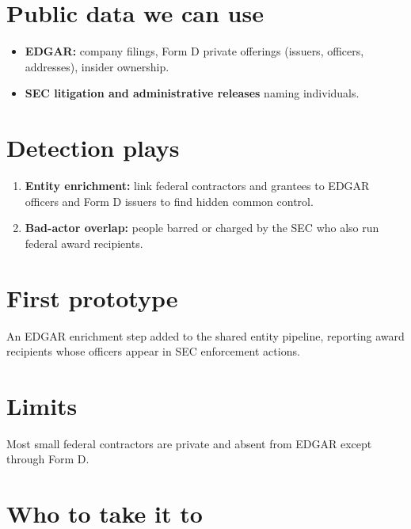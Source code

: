 \documentclass[letterpaper,11pt]{article}
\providecommand{\tightlist}{\setlength{\itemsep}{0pt}\setlength{\parskip}{0pt}}
\begin{document}
\hypertarget{public-data-we-can-use}{%
\section{Public data we can use}\label{public-data-we-can-use}}

\begin{itemize}
\tightlist
\item
  \textbf{EDGAR:} company filings, Form D private offerings (issuers,
  officers, addresses), insider ownership.
\item
  \textbf{SEC litigation and administrative releases} naming
  individuals.
\end{itemize}

\hypertarget{detection-plays}{%
\section{Detection plays}\label{detection-plays}}

\begin{enumerate}
\def\labelenumi{\arabic{enumi}.}
\tightlist
\item
  \textbf{Entity enrichment:} link federal contractors and grantees to
  EDGAR officers and Form D issuers to find hidden common control.
\item
  \textbf{Bad-actor overlap:} people barred or charged by the SEC who
  also run federal award recipients.
\end{enumerate}

\hypertarget{first-prototype}{%
\section{First prototype}\label{first-prototype}}

An EDGAR enrichment step added to the shared entity pipeline, reporting
award recipients whose officers appear in SEC enforcement actions.

\hypertarget{limits}{%
\section{Limits}\label{limits}}

Most small federal contractors are private and absent from EDGAR except
through Form D.

\hypertarget{who-to-take-it-to}{%
\section{Who to take it to}\label{who-to-take-it-to}}
\end{document}
